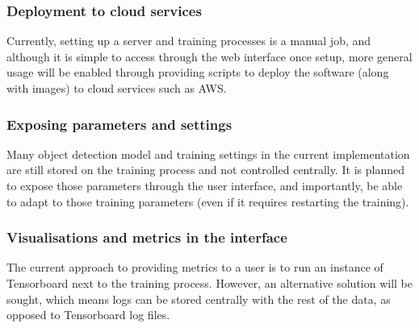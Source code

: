 \subsubsection {Deployment to cloud services}
Currently, setting up a server and training processes is a manual job, and although it is simple to access through the web interface once setup, more general usage will be enabled through providing scripts to deploy the software (along with images) to cloud services such as \gls{AWS}. 

\subsubsection {Exposing parameters and settings}
 Many object detection model and training settings in the current implementation are still stored on the training process and not controlled centrally. It is planned to expose those parameters through the user interface, and importantly, be able to adapt to those training parameters (even if it requires restarting the training).

\subsubsection{Visualisations and metrics in the interface}

The current approach to providing metrics to a user is to run an instance of Tensorboard next to the training process. However, an alternative solution will be sought, which means logs can be stored centrally with the rest of the data, as opposed to Tensorboard log files.

